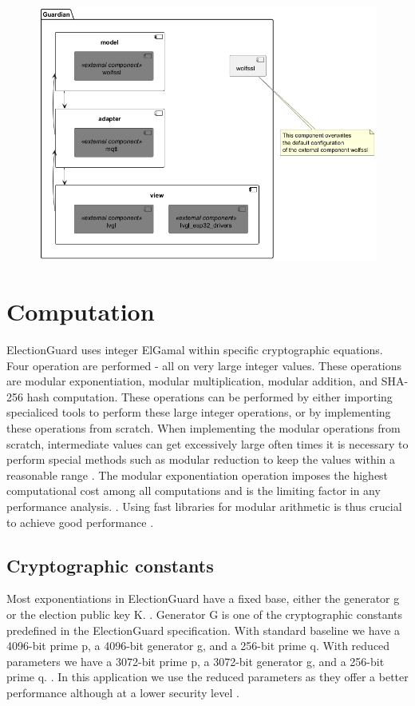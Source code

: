 \begin{figure}
	\centering
	\includegraphics[width=1\textwidth]{abbildungen/Diagramme/components.png}
	\caption{}
	\label{Fig:uml-classes-python}
\end{figure}


\section{Computation}
ElectionGuard uses integer ElGamal within specific cryptographic equations. Four operation are performed - all on very large integer values. These operations are modular exponentiation, modular multiplication, modular addition, and SHA-256 hash computation. These operations can be performed by either importing specialiced tools to perform these large integer operations, or by implementing these operations from scratch. When implementing the modular operations from scratch, intermediate values can get excessively large often times it is necessary to perform special methods such as modular reduction to keep the values within a reasonable range \cite[21, 25-26]{eg-spec}. The modular exponentiation operation imposes the highest computational cost among all computations and is the limiting factor in any performance analysis. \cite[22]{eg-spec}. Using fast libraries for modular arithmetic is thus crucial to achieve good performance \cite[22]{eg-paper}.

\subsection{Cryptographic constants}
Most exponentiations in ElectionGuard have a fixed base, either the generator g or the election public key K. \cite[22]{eg-paper}. Generator G is one of the cryptographic constants predefined in the ElectionGuard specification. With standard baseline we have a 4096-bit prime p, a 4096-bit generator g, and a 256-bit prime q. With reduced parameters we have a 3072-bit prime p, a 3072-bit generator g, and a 256-bit prime q. \cite[21-23]{eg-spec}. In this application we use the reduced parameters as they offer a better performance although at a lower security level \cite[36-37]{eg-spec}.


